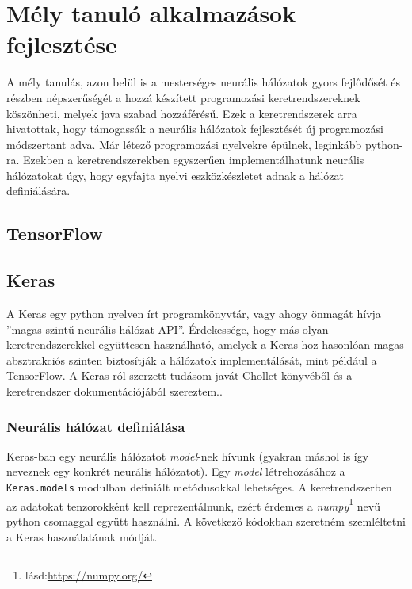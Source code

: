 \chapter{Mély tanuló alkalmazások fejlesztése}
A mély tanulás, azon belül is a mesterséges neurális hálózatok gyors fejlődősét és részben népszerűségét a hozzá készített programozási keretrendszereknek köszönheti, melyek java szabad hozzáférésű. Ezek a keretrendszerek arra hivatottak, hogy támogassák a neurális hálózatok fejlesztését új programozási módszertant adva. Már létező programozási nyelvekre épülnek, leginkább python-ra. Ezekben a keretrendszerekben egyszerűen implementálhatunk neurális hálózatokat úgy, hogy egyfajta nyelvi eszközkészletet adnak a hálózat definiálására.

\section{TensorFlow}

\section{Keras}

A Keras egy python nyelven írt programkönyvtár, vagy ahogy önmagát hívja ''magas szintű neurális hálózat API''\cite{web:Keras}. Érdekessége, hogy más olyan keretrendszerekkel együttesen használható, amelyek a Keras-hoz hasonlóan magas absztrakciós szinten biztosítják a hálózatok implementálását, mint például a TensorFlow. A Keras-ról szerzett tudásom javát Chollet könyvéből és a keretrendszer dokumentációjából szereztem.\cite{Chollet}\cite{web:Keras}.

\subsection{Neurális hálózat definiálása}

Keras-ban egy neurális hálózatot \emph{model}-nek hívunk (gyakran máshol is így neveznek egy konkrét neurális hálózatot). Egy \emph{model} létrehozásához a \verb|Keras.models| modulban definiált metódusokkal lehetséges. A keretrendszerben az adatokat tenzorokként kell reprezentálnunk, ezért érdemes a \emph{numpy}\footnote{lásd:\url{https://numpy.org/}} nevű python csomaggal együtt használni. A következő kódokban szeretném szemléltetni a Keras használatának módját.

